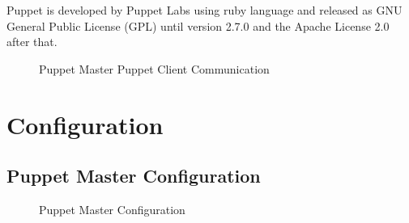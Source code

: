 \documentclass[9pt,twocolumn,twoside]{../../styles/osajnl}
\begin{document}
Puppet is developed by Puppet Labs using ruby language and released as
GNU General Public License (GPL) until version 2.7.0 and the Apache
License 2.0 after that.\cite{www-wiki-puppet}

\begin{figure}[htbp]
\centering
{}
\caption{Puppet Master Puppet Client Communication}
\label{fig:Puppet}
\end{figure}


\section{Configuration}


\subsection {Puppet Master Configuration}

\begin{figure}[htbp]
\centering
{}
\caption{Puppet Master Configuration}
\label{fig:Puppet}
\end{figure} \cite{www-techarena}
\end{document}
